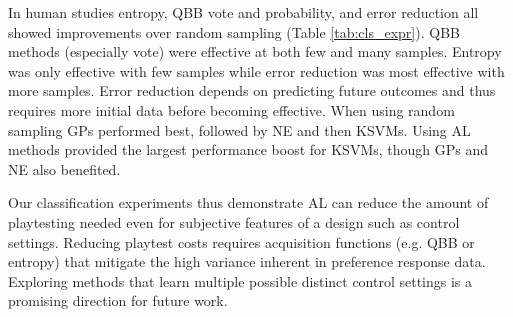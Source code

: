 \documentclass{sig-alternate}
\begin{document}
\begin{table}[tb]
%
\label{tab:cls_expr}
\end{table}

In human studies entropy, QBB vote and probability, and error reduction all showed improvements over random sampling (Table \ref{tab:cls_expr}).
QBB methods (especially vote) were effective at both few and many samples.
Entropy was only effective with few samples while error reduction was most effective with more samples.
Error reduction depends on predicting future outcomes and thus requires more initial data before becoming effective.
When using random sampling GPs performed best, followed by NE and then KSVMs.
Using AL methods provided the largest performance boost for KSVMs, though GPs and NE also benefited.


Our classification experiments thus demonstrate AL can reduce the amount of playtesting needed even for subjective features of a design such as control settings.
Reducing playtest costs requires acquisition functions (e.g. QBB or entropy) that mitigate the high variance inherent in preference response data.
Exploring methods that learn multiple possible distinct control settings is a promising direction for future work.
\end{document}
